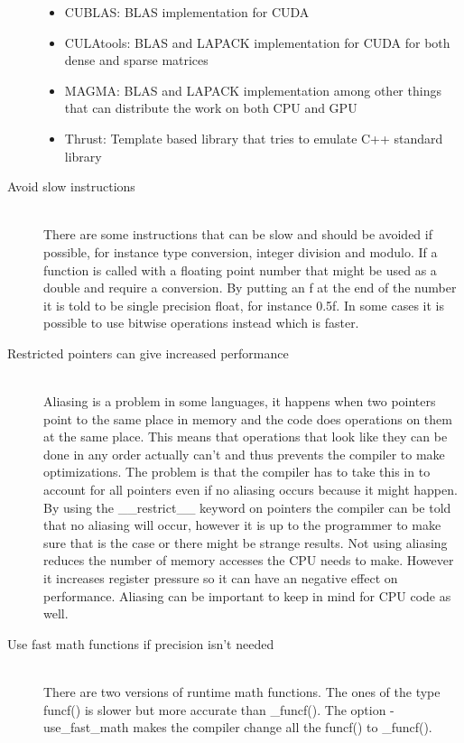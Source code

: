 \documentclass[10pt,a4paper]{article}
\begin{document}
\begin{description}
  \begin{itemize}
    \item CUBLAS: BLAS implementation for CUDA\cite{cublas}
    \item CULAtools: BLAS and LAPACK implementation for CUDA for both dense and sparse matrices\cite{culatools}
    \item MAGMA: BLAS and LAPACK implementation among other things that can distribute the work on both CPU and GPU\cite{magma_2010}
    \item Thrust: Template based library that tries to emulate C++ standard library\cite{thrust_gpu}
  \end{itemize}
  \item[Avoid slow instructions] \hfill \\
  There are some instructions that can be slow and should be avoided if possible, for instance type conversion, integer division and modulo. If a function is called with a floating point number that might be used as a double and require a conversion. By putting an f at the end of the number it is told to be single precision float, for instance 0.5f. In some cases it is possible to use bitwise operations instead which is faster.\cite{cuda, cuda_best_practice}
  \item[Restricted pointers can give increased performance] \hfill \\
  Aliasing is a problem in some languages, it happens when two pointers point to the same place in memory and the code does operations on them at the same place. This means that operations that look like they can be done in any order actually can't and thus prevents the compiler to make optimizations. The problem is that the compiler has to take this in to account for all pointers even if no aliasing occurs because it might happen. By using the \_\_restrict\_\_ keyword on pointers the compiler can be told that no aliasing will occur, however it is up to the programmer to make sure that is the case or there might be strange results. Not using aliasing reduces the number of memory accesses the CPU needs to make. However it increases register pressure so it can have an negative effect on performance.\cite{cuda} Aliasing can be important to keep in mind for CPU code as well\cite{drepper2007cpumemory}.
  \item[Use fast math functions if precision isn't needed] \hfill \\
  There are two versions of runtime math functions. The ones of the type funcf() is slower but more accurate than \_funcf(). The option -use\_fast\_math makes the compiler change all the funcf() to \_funcf().\cite{cuda_best_practice}
\end{description}
\end{document}
